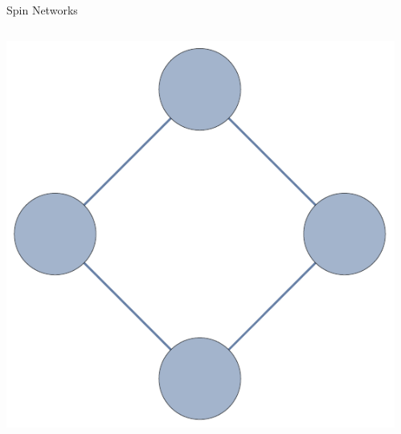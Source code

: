 \documentclass{beamer}
\begin{document}
\begin{frame}[t]{Spin Networks}
	\begin{columns}[T]
		\begin{column}{0.33\textwidth}
			\centering
   			\includegraphics[width=\textwidth]{Images/ring4_nolabels}
		\end{column}
		\begin{column}{0.33\textwidth}
			\centering

\end{column}
\end{columns}
\end{frame}
\end{document}
